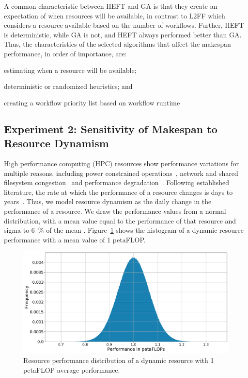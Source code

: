 A common characteristic between HEFT and GA is that they create an expectation
of when resources will be available, in contrast to L2FF which considers a
resource available based on the number of workflows.
Further, HEFT is deterministic, while GA is not, and HEFT always performed
better than GA.
Thus, the characteristics of the selected algorithms that affect the
makespan performance, in order of importance, are:
\begin{inparaenum}[(1)]
    \item estimating when a resource will be available;
    \item deterministic or randomized heuristics; and
    \item creating a workflow priority list based on workflow runtime
\end{inparaenum}

\subsection{Experiment 2: Sensitivity of Makespan to Resource Dynamism}
\label{ssec:res_dyn}
High performance computing (HPC) resources show performance variations for
multiple reasons, including power constrained
operations~\cite{inadomi2015analyzing}, network and shared filesystem
congestion~\cite{brown2018interference} and performance
degradation~\cite{wu2017survey}. Following established literature, the rate at
which the performance of a resource changes is days to
years~\cite{skinner2005understanding}. Thus, we model resource dynamism as the
daily change in the performance of a resource. We draw the performance values
from a normal distribution, with a mean value equal to the performance of that
resource and sigma to 6~\% of the mean .
Figure~\ref{fig:dynamic_res} shows the histogram of a dynamic resource
performance with a mean value of 1 petaFLOP.

\begin{figure}[t]
    \centering
    \includegraphics[width=.75\textwidth]{figures/campaign/DynRes.pdf}
    \caption{Resource performance distribution of a dynamic resource with 1
    petaFLOP average performance.}
    \label{fig:dynamic_res}
\end{figure}

